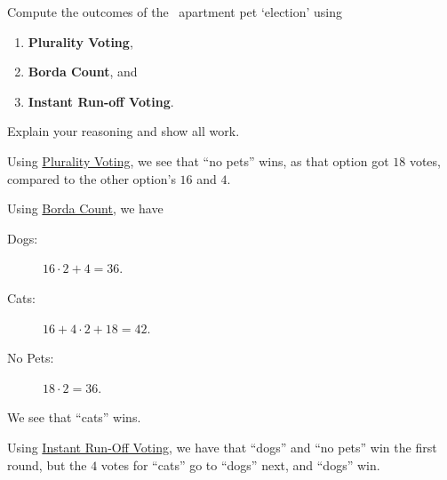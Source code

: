 \documentclass[nooutcomes,noauthor,hints,handout,12pt]{ximera}
\begin{document}
\mynewpage




\begin{question}
  Compute the outcomes of the \mooculus~apartment pet `election'
  using
  \begin{enumerate}
  \item \textbf{Plurality Voting},
  \item \textbf{Borda Count}, and
  \item \textbf{Instant Run-off Voting}.
  \end{enumerate}
  Explain your reasoning and show all work.
  \begin{freeResponse}
    Using \underline{Plurality Voting}, we see that ``no pets'' wins, as that
    option got $18$ votes, compared to the other option's $16$ and
    $4$.


    
    Using \underline{Borda Count}, we have
    \begin{description}
      \item[Dogs:] $16\cdot 2 + 4 = 36$.
      \item[Cats:] $16 +4\cdot 2+18 =42$.
      \item[No Pets:] $18\cdot 2 = 36$.
    \end{description}
  
  We see that ``cats'' wins.

  

  Using \underline{Instant Run-Off Voting}, we have that ``dogs'' and
  ``no pets'' win the first round, but the $4$ votes for ``cats'' go
  to ``dogs'' next, and ``dogs'' win.
  \end{freeResponse}
\end{question}
\mynewpage
\end{document}
